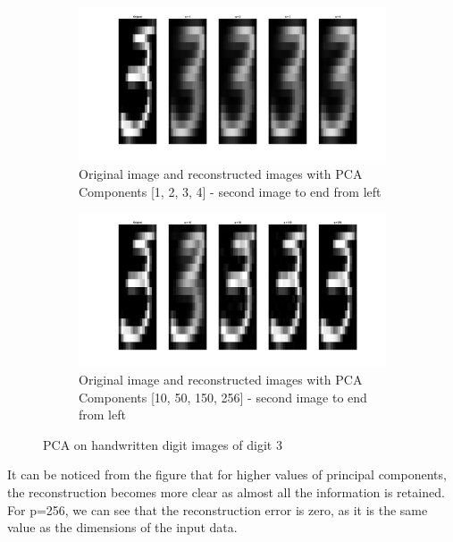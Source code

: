 \begin{figure}[!htpb]
	\centering
	\begin{subfigure}[b]{0.5\textwidth}
		\captionsetup{width=0.9\linewidth, format = hang}
		\includegraphics[height = 0.3\textwidth,width = 1.1\textwidth]{Exercise3/Report/pca_dig_1}
		\caption{Original image and reconstructed images with PCA Components [1, 2, 3, 4] - second image to end from left }\label{fig:dig3_1}
	\end{subfigure}%
	\begin{subfigure}[b]{0.5\textwidth}
		\captionsetup{width=0.9\linewidth, format = hang}
		\includegraphics[height = 0.3\textwidth,width = 1.1\textwidth]{Exercise3/Report/pca_dig_2}
		\caption{Original image and reconstructed images with PCA Components [10, 50, 150, 256] - second image to end from left}\label{fig:dig3_2}
	\end{subfigure}%
	\caption{PCA on handwritten digit images of digit 3 }
	\label{fig:dig3}
\end{figure} 
It can be noticed from the figure that for higher values of principal components, the reconstruction becomes more clear as almost all the information is retained. For p=256, we can see that the reconstruction error is zero, as it is the same value as the dimensions of the input data. 


